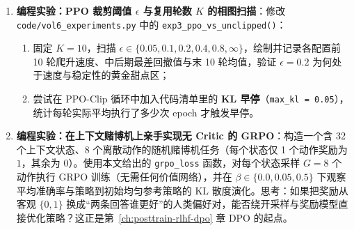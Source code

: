 \begin{enumerate}
  \item[\textbf{6.3.7}] \textbf{编程实验：PPO 裁剪阈值 $\epsilon$ 与复用轮数 $K$ 的相图扫描}：修改 \texttt{code/vol6\_experiments.py} 中的 \texttt{exp3\_ppo\_vs\_unclipped()}：
  \begin{enumerate}
    \item 固定 $K = 10$，扫描 $\epsilon \in \{0.05, 0.1, 0.2, 0.4, 0.8, \infty\}$，绘制并记录各配置前 10 轮爬升速度、中后期最差回撤值与末 10 轮均值，验证 $\epsilon = 0.2$ 为何处于速度与稳定性的黄金甜点区；
    \item 尝试在 PPO-Clip 循环中加入代码清单里的 \textbf{KL 早停}（\texttt{max\_kl = 0.05}），统计每轮实际平均执行了多少次 epoch 才触发早停。
  \end{enumerate}

  \item[\textbf{6.3.8}] \textbf{编程实验：在上下文赌博机上亲手实现无 Critic 的 GRPO}：构造一个含 32 个上下文状态、8 个离散动作的随机赌博机任务（每个状态仅 1 个动作奖励为 $1$，其余为 $0$）。使用本文给出的 \texttt{grpo\_loss} 函数，对每个状态采样 $G = 8$ 个动作执行 GRPO 训练（无需任何价值网络），并在 $\beta \in \{0.0, 0.05, 0.5\}$ 下观察平均准确率与策略到初始均匀参考策略的 KL 散度演化。思考：如果把奖励从客观 $\{0, 1\}$ 换成“两条回答谁更好”的人类偏好对，能否绕开采样与奖励模型直接优化策略？这正是第~\ref{ch:posttrain-rlhf-dpo} 章 DPO 的起点。
\end{enumerate}
